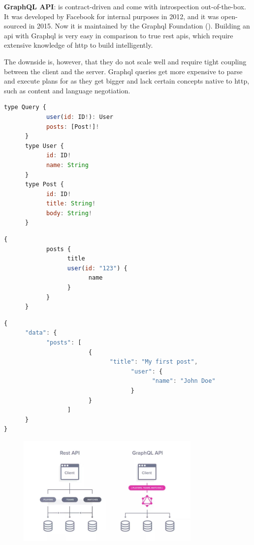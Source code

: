 \begin{multicols}{2}
      \begin{multicols}{2}
            \textbf{GraphQL API}:
            is contract-driven and come with introspection out-of-the-box. It was developed by Facebook for internal purposes
            in 2012, and it was open-sourced in 2015. Now it is maintained by the Graph\acrshort{ql} Foundation (\cite{graphql}).
            Building an \acrshort{api} with Graph\acrshort{ql} is very easy in comparison to true \acrshort{rest} \acrshort{api}s,
            which require extensive knowledge of \acrshort{http} to build intelligently.

            The downside is, however, that they do not scale well and require tight coupling between the client and the
            server. Graph\acrshort{ql} queries get more expensive to parse and execute plans for as they get bigger and
            lack certain concepts native to \acrshort{http}, such as content and language negotiation.
      \end{multicols}
      \begin{lstlisting}[language=JavaScript, caption=GraphQL's Schema Example]
      type Query {
            user(id: ID!): User
            posts: [Post!]!
      }
      type User {
            id: ID!
            name: String
      }
      type Post {
            id: ID!
            title: String!
            body: String!
      }
\end{lstlisting}
      \begin{lstlisting}[language=JavaScript, caption=GraphQL's Request Example to Specific Data]
      {
            posts {
                  title
                  user(id: "123") {
                        name
                  }
            }
      }
\end{lstlisting}
      \begin{lstlisting}[language=JavaScript, caption=GraphQL's Return Data Example]
{
      "data": {
            "posts": [
                        {
                              "title": "My first post",
                                    "user": {
                                          "name": "John Doe"
                                    }
                        }
                  ]
      }
}            
\end{lstlisting}
      \begin{figure}[htbp] %
            \centering
            \includegraphics[width=0.8\textwidth]{Figures/graphql.jpg}

\end{figure}
\end{multicols}
